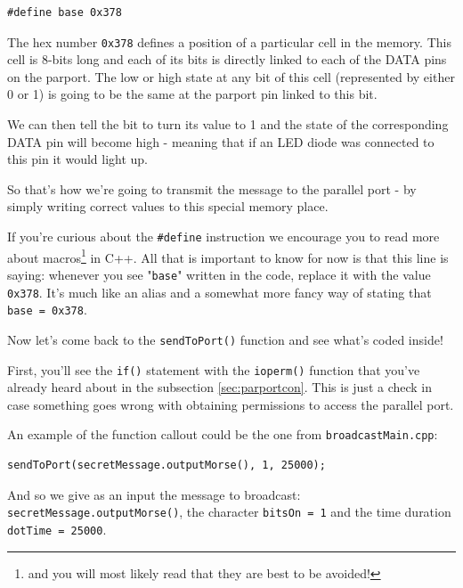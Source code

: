 \documentclass[12pt]{report}
\begin{document}
\begin{lstlisting}
#define base 0x378
\end{lstlisting}

The hex number \texttt{0x378} defines a position of a particular cell in the memory. This cell is 8-bits long and each of its bits is directly linked to each of the DATA pins on the parport. The low or high state at any bit of this cell (represented by either 0 or 1) is going to be the same at the parport pin linked to this bit.

We can then tell the bit to turn its value to 1 and the state of the corresponding DATA pin will become high - meaning that if an LED diode was connected to this pin it would light up.

So that's how we're going to transmit the message to the parallel port - by simply writing correct values to this special memory place.

If you're curious about the \texttt{\#define} instruction we encourage you to read more about macros\footnote{and you will most likely read that they are best to be avoided!} in C++. All that is important to know for now is that this line is saying: whenever you see "\texttt{base}" written in the code, replace it with the value \texttt{0x378}. It's much like an alias and a somewhat more fancy way of stating that \texttt{base = 0x378}.

Now let's come back to the \texttt{sendToPort()} function and see what's coded inside!

First, you'll see the \texttt{if()} statement with the \texttt{ioperm()} function that you've already heard about in the subsection \ref{sec:parportcon}. This is just a check in case something goes wrong with obtaining permissions to access the parallel port.












An example of the function callout could be the one from \texttt{broadcastMain.cpp}:

\begin{lstlisting}
sendToPort(secretMessage.outputMorse(), 1, 25000);
\end{lstlisting}

And so we give as an input the message to broadcast: \texttt{secretMessage.outputMorse()}, the character \texttt{bitsOn = 1} and the time duration \texttt{dotTime = 25000}.
\end{document}
